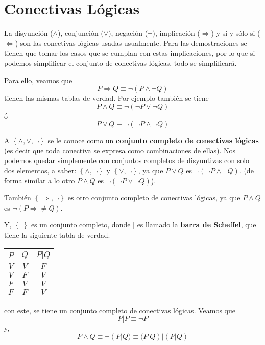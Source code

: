 \documentclass[12pt]{report}
\theoremstyle{largebreak}
\begin{document}
    \section{Conectivas Lógicas}

    La disyunción ($\land$), conjunción ($\lor$), negación ($\neg$), implicación ($\Rightarrow$) y si y sólo si ($\iff$) son las conectivas lógicas usadas usualmente. Para las demostraciones se tienen que tomar los casos que se cumplan con estas implicaciones, por lo que si podemos simplificar el conjunto de conectivas lógicas, todo se simplificará.

    Para ello, veamos que
    \begin{equation*}
        P\Rightarrow Q \equiv \neg(P\land\neg Q)
    \end{equation*}
    tienen las mismas tablas de verdad. Por ejemplo también se tiene
    \begin{equation*}
        P\land Q\equiv \neg(\neg P\lor\neg Q)
    \end{equation*}
    ó
    \begin{equation*}
        P\lor Q\equiv\neg(\neg P\land\neg Q)
    \end{equation*}

    A $\left\{\land, \lor, \neg \right\}$ se le conoce como un \textbf{conjunto completo de conectivas lógicas} (es decir que toda conectiva se expresa como combinaciones de ellas). Nos podemos quedar simplemente con conjuntos completos de disyuntivas con solo dos elementos, a saber: $\left\{\land, \neg \right\}$ y $\left\{\lor, \neg \right\}$, ya que $P\lor Q$ es $\neg(\neg P\land \neg Q)$. (de forma similar a lo otro $P\land Q$ es $\neg(\neg P\lor \neg Q)$).

    También $\left\{\Rightarrow, \neg \right\}$ es otro conjunto completo de conectivas lógicas, ya que $P\land Q$ es $\neg(P\Rightarrow\neq Q)$.

    Y, $\left\{|\right\}$ es un conjunto completo, donde $|$ es llamado la \textbf{barra de Scheffel}, que tiene la siguiente tabla de verdad.

    \begin{center}
        \begin{tabular}{c c | c}
            \hline
            $P$ & $Q$ & $P|Q$ \\
            \hline
            $V$ & $V$ & $F$ \\
            $V$ & $F$ & $V$ \\
            $F$ & $V$ & $V$ \\
            $F$ & $F$ & $V$ \\
        \end{tabular}
    \end{center}
    con este, se tiene un conjunto completo de conectivas lógicas. Veamos que
    \begin{equation*}
        P|P\equiv\neg P
    \end{equation*}
    y,
    \begin{equation*}
        P\land Q\equiv \neg(P|Q)\equiv (P|Q)|(P|Q)
    \end{equation*}
\end{document}
